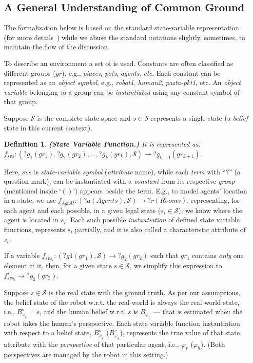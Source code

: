 \documentclass[letterpaper]{article} %
\newtheorem{definition}{Definition}
\begin{document}
\subsection{A General Understanding of Common Ground}
The formalization below is based on the standard state-variable representation (for more details~\cite{naubooks0014222}) while we abuse the standard notations slightly, sometimes, to maintain the flow of the discussion.

To describe an environment a set of  is used. 
Constants are often classified as different groups ($gr$), e.g., \textit{places}, \textit{pots}, \textit{agents}, \textit{etc.} 
Each constant can be represented as an \textit{object symbol}, e.g., \textit{robot1}, \textit{human2}, \textit{pasta-pkt1}, etc. 
An \textit{object variable} belonging to a group can be \textit{instantiated} using any constant symbol of that group.



Suppose $\mathcal{S}$ is the complete state-space and $s \in \mathcal{S}$ represents a single state (a \textit{belief} state in this current context).  

\begin{definition}\label{def:svf}
\textbf{(State Variable Function.)} It is represented as: $f_{svs}:(?g_1 (gr_1), ?g_2 (gr_2), ..., ?g_k (gr_k),\mathcal{S})\rightarrow ?g_{k+1} (gr_{k+1})$. 
\end{definition}
Here, $svs$ is \textit{state-variable symbol} (\textit{attribute} name), while each \textit{term} with ``$?$'' (a question mark), can be instantiated with a \textit{constant} from its respective \textit{group} (mentioned inside `$()$') appears beside the term. 
E.g., to model agents' location in a state, we use $f_{\textit{AgtAt}}:(?a (Agents), \mathcal{S}) \rightarrow ?r (Rooms)$, representing, for each agent and each possible, in a given legal state ($s_i \in \mathcal{S}$), we know where the agent is located in $s_i$. 
Each such possible \textit{instantiation} of defined state variable functions, represents $s_i$ partially, and it is also called a characteristic attribute of $s_i$.     

If a variable $f_{svs_i}: (?g1 (gr_1), \mathcal{S}) \rightarrow ?g_2 (gr_2)$ such that $gr_1$ contains \textit{only} one element in it, then, for a given state $s \in \mathcal{S}$, we simplify this expression to $f_{svs_i}^{s} \rightarrow ?g_2 (gr_2)$. 

Suppose $s \in \mathcal{S}$ is the real state with the ground truth. As per our assumptions, the belief state of the robot w.r.t. the real-world is always the real world state, i.e., $B_{\varphi_r}^s = s$, and the human belief w.r.t. $s$ is $B_{\varphi_h}^s$ --- that is estimated when the robot takes the human's perspective. Each state variable function instantiation with respect to a belief state, $B_{\varphi_r}^s$ ($B_{\varphi_h}^s$), represents the true value of that state attribute with the \textit{perspective} of that particular agent, i.e., $\varphi_r$ ($\varphi_h$). (Both perspectives are managed by the robot in this setting.) 
\end{document}
